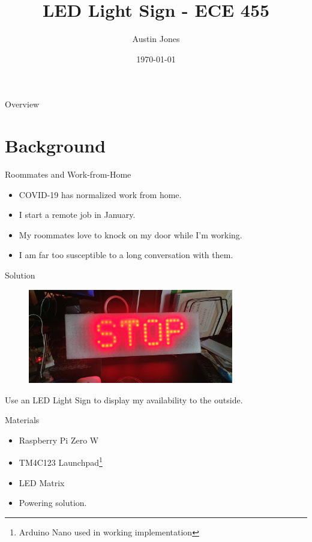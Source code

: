 \documentclass[10pt]{beamer}
\title{LED Light Sign \-- ECE 455}
\author{Austin Jones}
\institute{University of Tennessee \-- Knoxville}
\date{\today}
\begin{document}
\maketitle

\begin{frame}{Overview}
  \large
  \tableofcontents
\end{frame}

\section{Background}

\begin{frame}{Roommates and Work-from-Home}
  \Large
  \begin{itemize}
    \item COVID-19 has normalized work from home.
    \item I start a remote job in January.
    \item My roommates love to knock on my door while I'm working.
    \item I am far too susceptible to a long conversation with them.
  \end{itemize}
\end{frame}

\begin{frame}{Solution}
  \begin{figure}
    \centering
    \includegraphics[width=0.8\textwidth]{figures/Stop.jpg}
  \end{figure}
  \centering
  Use an LED Light Sign to display my availability to the outside.
\end{frame}

\begin{frame}{Materials}
  \Large
  \begin{itemize}
    \item Raspberry Pi Zero W
    \item TM4C123 Launchpad\footnote{Arduino Nano used in working implementation}
    \item LED Matrix
    \item Powering solution.
  \end{itemize}
\end{frame}
\end{document}
